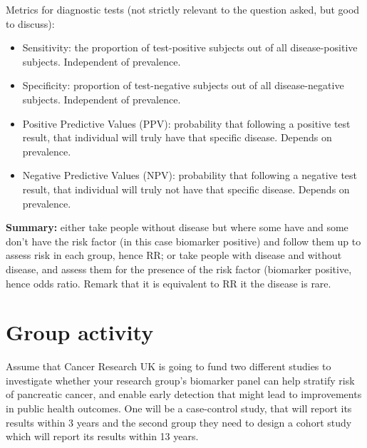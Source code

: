 \documentclass[a4paper,11pt]{scrartcl}
\newcommand{\ignore}[1]{}
\theoremstyle{plain}
\theoremstyle{remark}
\theoremstyle{definition}
\begin{document}
{\begin{itshape}
Metrics for diagnostic tests (not strictly relevant to the question asked, but good to discuss):
\begin{itemize}
\item Sensitivity: the proportion of test-positive subjects out of all disease-positive subjects. Independent of prevalence.
\item Specificity: proportion of test-negative subjects out of all disease-negative subjects. Independent of prevalence.
\item Positive Predictive Values (PPV): probability that following a positive test result, that individual will truly have that specific disease. Depends on prevalence. 
\item Negative Predictive Values (NPV): probability that following a negative test result, that individual will truly not have that specific disease. Depends on prevalence. 
\end{itemize}

\textbf{Summary:} either take people without disease but where some have and some don’t have the risk factor (in this case biomarker positive) and follow them up to assess risk in each group, hence RR; or take people with disease and without disease, and assess them for the presence of the risk factor (biomarker positive, hence odds ratio. Remark that it is equivalent to RR it the disease is rare.

\end{itshape}
}
\section{Group activity}
\ignore{
\subsection{Work in small groups (30 minutes)}

\textit{\textbf{Split the students into (muliples of) two groups (no more than 8 in each group) and tell them:}}

\medskip

}
Assume that Cancer Research UK is going to fund two different studies to investigate whether your research group’s biomarker panel can help stratify risk of pancreatic cancer, and enable early detection that might lead to improvements in public health outcomes. One will be a case-control study, that will report its results within 3 years and the second group they need to design a cohort study which will report its results within 13 years.
\end{document}
